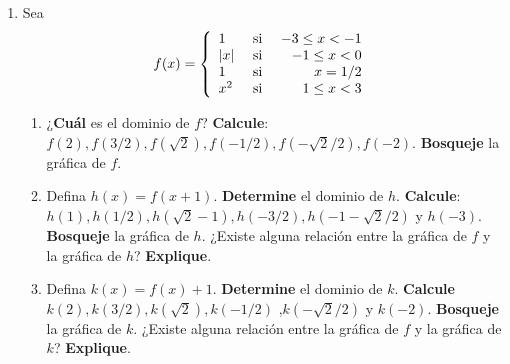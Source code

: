 \documentclass[12pt]{article}
\begin{document}
\begin{enumerate}
    \item Sea
    \begin{equation*}
        f(x)=\left\{
            \begin{array}{lcr}
                1 & \textup{ si } & -3\leq x<-1\\
                \left| x \right| & \textup{ si } & -1\leq x<0\\
                1 & \textup{ si } & x=1/2\\
                x^2 & \textup{ si } & 1\leq x<3 
            \end{array}
        \right.
    \end{equation*}
    \begin{enumerate}
        \item ¿\textbf{Cuál} es el dominio de $f$? \textbf{Calcule}: $f(2),f(3/2),f(\sqrt{2}),f(-1/2),f(-\sqrt{2}/2),f(-2)$. \textbf{Bosqueje} la gráfica de $f$.
        \item Defina $h(x)=f(x+1)$. \textbf{Determine} el dominio de $h$. \textbf{Calcule}: $h(1),h(1/2),h(\sqrt{2}-1),h(-3/2),h(-1-\sqrt{2}/2)$ y $h(-3)$. \textbf{Bosqueje} la gráfica de $h$. ¿Existe alguna relación entre la gráfica de $f$ y la gráfica de $h$? \textbf{Explique}.
        \item Defina $k(x)=f(x)+1$. \textbf{Determine} el dominio de $k$. \textbf{Calcule} $k(2),k(3/2),k(\sqrt{2}),k(-1/2)$ ,$k(-\sqrt{2}/2)$ y $k(-2)$. \textbf{Bosqueje} la gráfica de $k$. ¿Existe alguna relación entre la gráfica de $f$ y la gráfica de $k$? \textbf{Explique}.
    \end{enumerate}


\end{enumerate}
\end{document}
